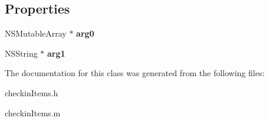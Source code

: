 \subsection*{Properties}
\begin{DoxyCompactItemize}
\item 
\hypertarget{interfacecheckin_items_ab5ebcc9694d8c0ae4501d4e8c4674cda}{}N\+S\+Mutable\+Array $\ast$ {\bfseries arg0}\label{interfacecheckin_items_ab5ebcc9694d8c0ae4501d4e8c4674cda}

\item 
\hypertarget{interfacecheckin_items_ae725619310ee902ad923bb1f9cb00589}{}N\+S\+String $\ast$ {\bfseries arg1}\label{interfacecheckin_items_ae725619310ee902ad923bb1f9cb00589}

\end{DoxyCompactItemize}


The documentation for this class was generated from the following files\+:\begin{DoxyCompactItemize}
\item 
checkin\+Items.\+h\item 
checkin\+Items.\+m\end{DoxyCompactItemize}
